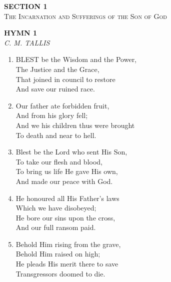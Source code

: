 \newpage
\thispagestyle{empty}
\vspace*{3.5cm}
\begin{center}
    {\LARGE \textbf{SECTION 1}}\\[0.8em]
    {\Large \textsc{The Incarnation and Sufferings of the Son of God}}
\end{center}
\vspace{3.5cm}

\newpage
\begin{center}
    {\Large \textbf{HYMN 1}}
    \\
    \textit{C. M. TALLIS}
\end{center}
\vspace{1em}

\begin{enumerate}
    \item BLEST be the Wisdom and the Power, \\
        The Justice and the Grace, \\
        That joined in council to restore \\
        And save our ruined race.

    \item Our father ate forbidden fruit, \\
        And from his glory fell; \\
        And we his children thus were brought \\
        To death and near to hell.

    \item Blest be the Lord who sent His Son, \\
        To take our flesh and blood, \\
        To bring us life He gave His own, \\
        And made our peace with God.

    \item He honoured all His Father's laws \\
        Which we have disobeyed; \\
        He bore our sins upon the cross, \\
        And our full ransom paid.

    \item Behold Him rising from the grave, \\
        Behold Him raised on high; \\
        He pleads His merit there to save \\
        Transgressors doomed to die.


\end{enumerate}
